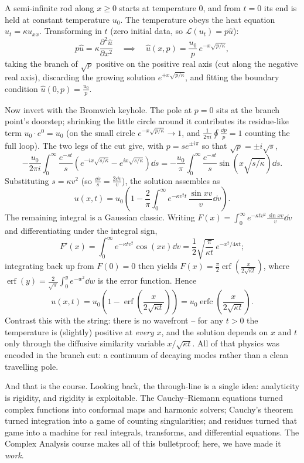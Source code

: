 \documentclass[a4paper]{scrartcl}
\begin{document}
\begin{example}
	A semi-infinite rod along $x \geq 0$ starts at temperature $0$, and from $t = 0$ its end is held at constant temperature $u_0$. The temperature obeys the heat equation $u_t = \kappa u_{xx}$. Transforming in $t$ (zero initial data, so $\mathcal L(u_t) = p \hat u$):
	$$
	p \hat u = \kappa \frac{\partial^2 \hat u}{\partial x^2}
	\quad\implies\quad
	\hat u(x, p) = \frac{u_0}{p}\, e^{-x\sqrt{p/\kappa}},
	$$
	taking the branch of $\sqrt p$ positive on the positive real axis (cut along the negative real axis), discarding the growing solution $e^{+x\sqrt{p/\kappa}}$, and fitting the boundary condition $\hat u(0, p) = \frac{u_0}{p}$.

	Now invert with the Bromwich keyhole. The pole at $p = 0$ sits at the branch point's doorstep; shrinking the little circle around it contributes its residue-like term $u_0 \cdot e^{0} = u_0$ (on the small circle $e^{-x\sqrt{p/\kappa}} \to 1$, and $\frac{1}{2\pi i}\oint \frac{\dd p}{p} = 1$ counting the full loop). The two legs of the cut give, with $p = se^{\pm i\pi}$ so that $\sqrt{p} = \pm i \sqrt s$,
	$$
	-\frac{u_0}{2\pi i} \int_0^\infty \frac{e^{-st}}{s}\left(e^{-ix\sqrt{s/\kappa}} - e^{ix\sqrt{s/\kappa}}\right) \dd s
	= -\frac{u_0}{\pi} \int_0^\infty \frac{e^{-st}}{s} \sin\left(x\sqrt{s/\kappa}\right) \dd s.
	$$
	Substituting $s = \kappa v^2$ (so $\frac{\dd s}{s} = \frac{2 \dd v}{v}$), the solution assembles as
	$$
	u(x, t) = u_0\left(1 - \frac{2}{\pi}\int_0^\infty e^{-\kappa v^2 t}\, \frac{\sin xv}{v} \dd v\right).
	$$
	The remaining integral is a Gaussian classic. Writing $F(x) = \int_0^\infty e^{-\kappa t v^2} \frac{\sin xv}{v} \dd v$ and differentiating under the integral sign,
	$$
	F'(x) = \int_0^\infty e^{-\kappa t v^2}\cos(xv) \dd v = \frac 12 \sqrt{\frac{\pi}{\kappa t}}\, e^{-x^2/4\kappa t};
	$$
	integrating back up from $F(0) = 0$ then yields $F(x) = \frac{\pi}{2}\operatorname{erf}\left(\frac{x}{2\sqrt{\kappa t}}\right)$, where $\operatorname{erf}(y) = \frac{2}{\sqrt \pi}\int_0^y e^{-w^2}\dd w$ is the error function. Hence
	$$
	u(x, t) = u_0 \left(1 - \operatorname{erf}\left(\frac{x}{2\sqrt{\kappa t}}\right)\right) = u_0 \operatorname{erfc}\left(\frac{x}{2\sqrt{\kappa t}}\right).
	$$
	Contrast this with the string: there is no wavefront -- for any $t > 0$ the temperature is (slightly) positive at \emph{every} $x$, and the solution depends on $x$ and $t$ only through the diffusive similarity variable $x/\sqrt{\kappa t}$. All of that physics was encoded in the branch cut: a continuum of decaying modes rather than a clean travelling pole.
\end{example}

And that is the course. Looking back, the through-line is a single idea: analyticity is rigidity, and rigidity is exploitable. The Cauchy--Riemann equations turned complex functions into conformal maps and harmonic solvers; Cauchy's theorem turned integration into a game of counting singularities; and residues turned that game into a machine for real integrals, transforms, and differential equations. The Complex Analysis course makes all of this bulletproof; here, we have made it \emph{work}.
\end{document}
